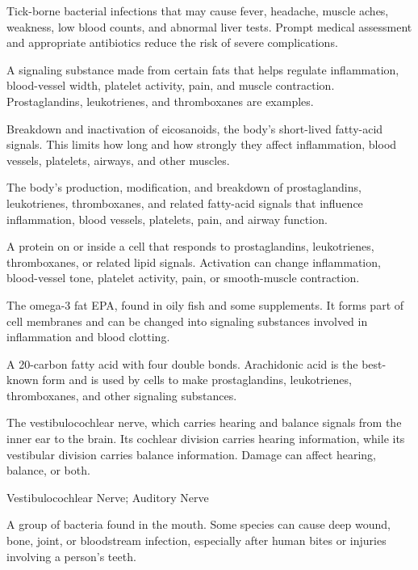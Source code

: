  Tick-borne bacterial infections that may cause fever, headache, muscle aches, weakness, low blood counts, and abnormal liver tests. Prompt medical assessment and appropriate antibiotics reduce the risk of severe complications.

 A signaling substance made from certain fats that helps regulate inflammation, blood-vessel width, platelet activity, pain, and muscle contraction. Prostaglandins, leukotrienes, and thromboxanes are examples.

 Breakdown and inactivation of eicosanoids, the body’s short-lived fatty-acid signals. This limits how long and how strongly they affect inflammation, blood vessels, platelets, airways, and other muscles.

 The body’s production, modification, and breakdown of prostaglandins, leukotrienes, thromboxanes, and related fatty-acid signals that influence inflammation, blood vessels, platelets, pain, and airway function.

 A protein on or inside a cell that responds to prostaglandins, leukotrienes, thromboxanes, or related lipid signals. Activation can change inflammation, blood-vessel tone, platelet activity, pain, or smooth-muscle contraction.

 The omega-3 fat EPA, found in oily fish and some supplements. It forms part of cell membranes and can be changed into signaling substances involved in inflammation and blood clotting.

 A 20-carbon fatty acid with four double bonds. Arachidonic acid is the best-known form and is used by cells to make prostaglandins, leukotrienes, thromboxanes, and other signaling substances.

 The vestibulocochlear nerve, which carries hearing and balance signals from the inner ear to the brain. Its cochlear division carries hearing information, while its vestibular division carries balance information. Damage can affect hearing, balance, or both.

\synonyms
Vestibulocochlear Nerve; Auditory Nerve

 A group of bacteria found in the mouth. Some species can cause deep wound, bone, joint, or bloodstream infection, especially after human bites or injuries involving a person’s teeth.

